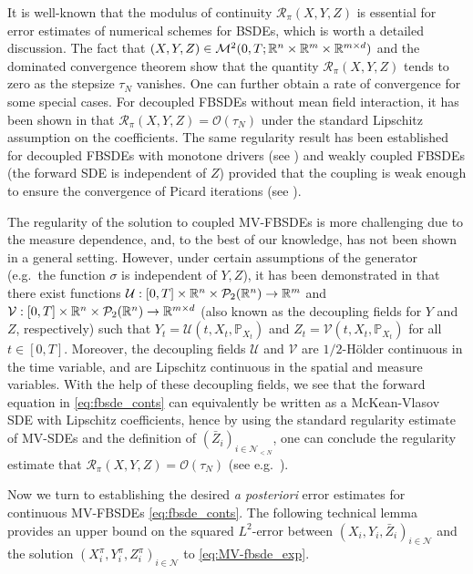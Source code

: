 \documentclass[11pt]{article}
\numberwithin{equation}{section}
\theoremstyle{definition}
\theoremstyle{remark}
\newtheorem{Remark}{Remark}[section]
\def\to{\rightarrow}
\def\l{\label}  \def\f{\frac}  \def\fa{\forall}
\def\cM{\mathcal{M}}
\def\cN{\mathcal{N}}
\def\cO{\mathcal{O}}
\def\cP{\mathcal{P}}
\def\cR{\mathcal{R}}
\def\cU{\mathcal{U}}
\def\cV{\mathcal{V}}
\def\sP{\mathbb{P}}
\def\sR{{\mathbb R}}
\begin{document}
It is well-known that 
the modulus of continuity   $\cR_\pi(X,Y,Z)$ 
is essential for error estimates of numerical schemes for BSDEs,
which is worth a detailed discussion.
The fact that $(X,Y, Z)\in \cM^2(0,T;\sR^n\t \sR^m\t \sR^{m\t d })$
and the dominated convergence theorem show that 
the quantity $\cR_\pi(X,Y,Z)$  tends to zero as the stepsize $\tau_N$ vanishes.
One can further obtain a rate of convergence for some special cases.
For decoupled FBSDEs without mean field interaction,
it has been shown  in 
\cite{zhang2004} that
 $\cR_\pi({X},{Y},{Z})=\cO(\tau_N)$
 under the standard Lipschitz assumption on the coefficients.
 The same regularity result has been established for 
decoupled FBSDEs with monotone drivers (see \cite{lionnet2015})
and weakly coupled FBSDEs (the forward SDE is independent of $Z$)
provided that the coupling is  weak enough to ensure the convergence of  Picard iterations
(see \cite{bender2008}).

 The  regularity of the solution to  coupled MV-FBSDEs is more challenging due to the measure dependence,
 and,  
 to the best of our knowledge, has not been shown in a general setting. However, under certain
    assumptions of the generator (e.g.~the function $\sigma$ is independent of $Y, Z$),
 it has been demonstrated in \cite{chassagneux2019} that 
there exist  functions $\cU : [0,T]\t \sR^n\t \cP_2(\sR^n)\to \sR^m$ 
and $\cV : [0,T]\t \sR^n\t \cP_2(\sR^n)\to \sR^{m\t d}$ 
(also known as the decoupling fields for $Y$ and $Z$, respectively)
such that
$Y_t=\cU(t,X_t,\sP_{X_t})$
and $Z_t=\cV(t,X_t,\sP_{X_t})$ for all $t\in [0,T]$.
Moreover, the decoupling fields $\cU$ and $\cV$ are $1/2$-H\"{o}lder continuous in the time variable,
and are Lipschitz continuous in the spatial and measure variables. 
With the help of these decoupling fields,
we see that the forward equation in \eqref{eq:fbsde_conts} can equivalently be written as a McKean-Vlasov SDE with Lipschitz coefficients,
hence by using the standard regularity estimate of MV-SDEs
and the definition of $(\bar{Z}_i)_{i\in \cN_{<N}}$,
one can conclude the  regularity estimate that  $\cR_\pi({X},{Y},{Z})=\cO(\tau_N)$ (see e.g.~\cite[Theorem 3.5 (iii)]{lionnet2015}).

Now we turn to establishing the desired \textit{a posteriori} error estimates for continuous MV-FBSDEs \eqref{eq:fbsde_conts}.
The following  technical lemma provides  an upper bound on the squared $L^2$-error between 
 $(X_i,Y_i,\bar{Z}_i)_{i\in \cN}$
 and the solution $(X^{\pi}_i, Y^{\pi}_i, Z^{\pi}_i)_{i\in \cN}$
to \eqref{eq:MV-fbsde_exp}.
\end{document}
